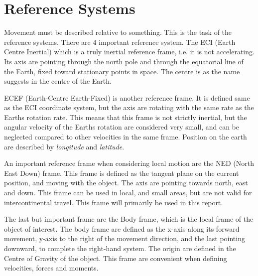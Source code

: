 \section{Reference Systems}
	Movement must be described relative to something. This is the task of the reference systems. There are
	4 important reference system. The ECI (Earth Centre Inertial) which is a truly inertial reference
	frame, i.e. it is not accelerating. Its axis are pointing through the north pole and through the
	equatorial line of the Earth, fixed toward stationary points in space. The centre is as the name
	suggests in the centre of the Earth. 
	
	ECEF (Earth-Centre Earth-Fixed) is another reference frame. It is defined same as the ECI coordinate
	system, but the axis are rotating with the same rate as the Earths rotation rate. This means that this frame
	is not
	strictly inertial, but the angular velocity of the Earths rotation are considered very small, and can
	be neglected compared to other velocities in the same frame. Position on the earth are described by
	\textit{longitude} and \textit{latitude}.

	An important reference frame when considering local motion are the NED (North East Down) frame. This
	frame is defined as the tangent plane on the current position, and moving with the object. The axis
	are pointing towards north, east and down. This frame can be used in local, and small areas, but are
	not valid for intercontinental travel. This frame will primarily be used in this report. 

	The last but important frame are the Body frame, which is the local frame of the object of interest.
	The body frame are defined as the x-axis along its forward movement, y-axis to the right of the
	movement direction, and the last pointing downward, to complete the right-hand system. The
	origin are defined in the Centre of Gravity of the object. This frame are convenient when
	defining velocities, forces and moments.
	

